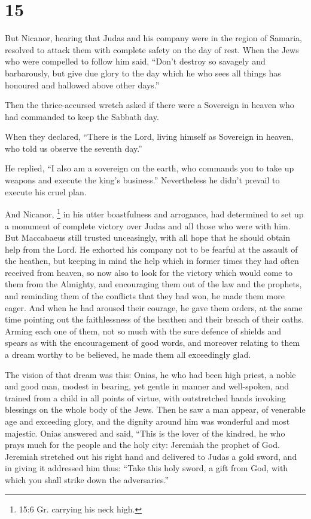 \hypertarget{section-13}{%
\section{15}\label{section-13}}

 But Nicanor, hearing that Judas and his company were in the
region of Samaria, resolved to attack them with complete safety on the
day of rest.  When the Jews who were compelled to follow him
said, ``Don't destroy so savagely and barbarously, but give due glory to
the day which he who sees all things has honoured and hallowed above
other days.''

 Then the thrice-accursed wretch asked if there were a
Sovereign in heaven who had commanded to keep the Sabbath day.

 When they declared, ``There is the Lord, living himself as
Sovereign in heaven, who told us observe the seventh day.''

 He replied, ``I also am a sovereign on the earth, who
commands you to take up weapons and execute the king's business.''
Nevertheless he didn't prevail to execute his cruel plan.

 And Nicanor, \footnote{15:6 Gr. carrying his neck high.} in
his utter boastfulness and arrogance, had determined to set up a
monument of complete victory over Judas and all those who were with him.
 But Maccabaeus still trusted unceasingly, with all hope
that he should obtain help from the Lord.  He exhorted his
company not to be fearful at the assault of the heathen, but keeping in
mind the help which in former times they had often received from heaven,
so now also to look for the victory which would come to them from the
Almighty,  and encouraging them out of the law and the
prophets, and reminding them of the conflicts that they had won, he made
them more eager.  And when he had aroused their courage, he
gave them orders, at the same time pointing out the faithlessness of the
heathen and their breach of their oaths.  Arming each one
of them, not so much with the sure defence of shields and spears as with
the encouragement of good words, and moreover relating to them a dream
worthy to be believed, he made them all exceedingly glad.

 The vision of that dream was this: Onias, he who had been
high priest, a noble and good man, modest in bearing, yet gentle in
manner and well-spoken, and trained from a child in all points of
virtue, with outstretched hands invoking blessings on the whole body of
the Jews.  Then he saw a man appear, of venerable age and
exceeding glory, and the dignity around him was wonderful and most
majestic.  Onias answered and said, ``This is the lover of
the kindred, he who prays much for the people and the holy city:
Jeremiah the prophet of God.  Jeremiah stretched out his
right hand and delivered to Judas a gold sword, and in giving it
addressed him thus:  ``Take this holy sword, a gift from
God, with which you shall strike down the adversaries.''

